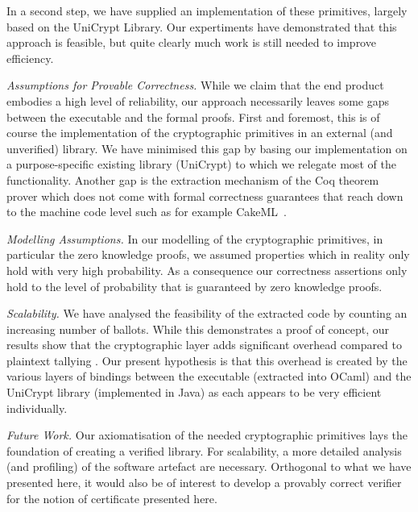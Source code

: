\documentclass{llncs}
\begin{document}
In a second step, we have supplied an implementation of these
primitives, largely based on the UniCrypt Library. Our expertiments
have demonstrated that this approach is feasible, but quite clearly
much work is still needed to improve efficiency. 

\smallskip\noindent\emph{Assumptions for Provable Correctness.}
While we claim that the end product embodies a high level of
reliability, our approach necessarily leaves some gaps between the
executable and the formal proofs. First and foremost, this is of
course the implementation of the cryptographic primitives in an
external (and unverified) library. We have minimised this gap by
basing our implementation on a purpose-specific existing library
(UniCrypt) to which we relegate most of the functionality. Another
gap is the extraction mechanism of the Coq theorem prover which does
not come with formal correctness guarantees that reach down to the
machine code level such as for example CakeML~\cite{Kumar:2014:CVI}.

\smallskip\noindent\emph{Modelling Assumptions.} In our modelling of
the cryptographic primitives, in particular the zero knowledge
proofs, we assumed properties which in reality only hold with
very high probability. As a
consequence our correctness assertions only hold to the level
of probability that is guaranteed by zero knowledge proofs.

\smallskip\noindent\emph{Scalability.} We have analysed the
feasibility of the extracted code by counting an increasing number
of ballots. While this demonstrates a proof of concept, our results
show that the cryptographic layer adds significant overhead compared
to plaintext tallying \cite{Pattinson:2017:SVE}.  Our present
hypothesis is that this overhead is created by the various layers of
bindings between the executable (extracted into OCaml) and the
UniCrypt library (implemented in Java) as each appears to be very
efficient individually. 

\smallskip\noindent\emph{Future Work.} Our axiomatisation of the
needed cryptographic primitives lays the foundation of creating a
verified library. For scalability, a more detailed analysis (and
profiling) of the software artefact are necessary. Orthogonal to
what we have presented here, it would also be of interest to develop
a provably correct verifier for the notion of certificate presented
here. 




%

%
%
\end{document}
